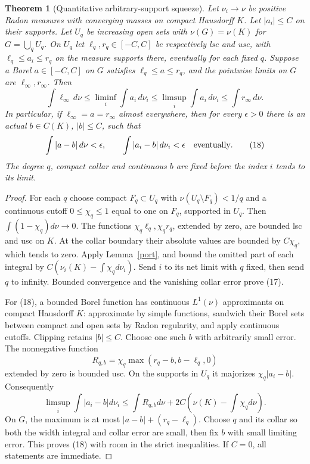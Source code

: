\documentclass[10pt]{article}
\newtheorem{theorem}{Theorem}[section]
\begin{document}
\begin{theorem}[Quantitative arbitrary-support squeeze]\label{squeeze}
Let $\nu_i\to\nu$ be positive Radon measures with converging masses on
compact Hausdorff $K$. Let $|a_i|\leq C$ on their supports. Let
$U_q$ be increasing open sets with $\nu(G)=\nu(K)$ for
$G=\bigcup_qU_q$. On $U_q$ let $\ell_q,r_q\in[-C,C]$ be respectively
lsc and usc, with $\ell_q\leq a_i\leq r_q$ on the measure supports
there, eventually for each fixed $q$.
Suppose a Borel $a\in[-C,C]$ on $G$ satisfies
$\ell_q\leq a\leq r_q$, and the pointwise limits on $G$ are
$\ell_\infty,r_\infty$. Then
\[
 \int\ell_\infty\,d\nu
 \leq\liminf_i\int a_i\,d\nu_i
 \leq\limsup_i\int a_i\,d\nu_i
 \leq\int r_\infty\,d\nu.                                \tag{17}
\]
In particular, if $\ell_\infty=a=r_\infty$ almost everywhere, then
for every $\epsilon>0$ there is an actual $b\in C(K)$, $|b|\leq C$,
such that
\[
 \int|a-b|\,d\nu<\epsilon,\qquad
 \int|a_i-b|\,d\nu_i<\epsilon\quad\hbox{eventually}.          \tag{18}
\]
The degree $q$, compact collar and continuous $b$ are fixed before
the index $i$ tends to its limit.
\end{theorem}
\begin{proof}
For each $q$ choose compact $F_q\subset U_q$ with
$\nu(U_q\setminus F_q)<1/q$ and a continuous cutoff $0\leq\chi_q\leq1$
equal to one on $F_q$, supported in $U_q$. Then
$\int(1-\chi_q)d\nu\to0$.
The functions $\chi_q\ell_q,\chi_qr_q$, extended by zero, are
bounded lsc and usc on $K$. At the collar boundary their absolute
values are bounded by $C\chi_q$, which tends to zero.
Apply Lemma~\ref{port}, and bound the omitted part of each integral
by $C(\nu_i(K)-\int\chi_qd\nu_i)$. Send $i$ to its net limit
with $q$ fixed, then send $q$ to infinity.
Bounded convergence and the vanishing collar error prove (17).

For (18), a bounded Borel function has continuous $L^1(\nu)$
approximants on compact Hausdorff $K$: approximate by simple functions,
sandwich their Borel sets between compact and open sets by Radon
regularity, and apply continuous cutoffs. Clipping retains $|b|\leq C$.
Choose one such $b$ with arbitrarily small error. The nonnegative
function
\[
 R_{q,b}=\chi_q\max(r_q-b,b-\ell_q,0)
\]
extended by zero is bounded usc. On the supports in $U_q$ it
majorizes $\chi_q|a_i-b|$. Consequently
\[
 \limsup_i\int|a_i-b|d\nu_i
 \leq\int R_{q,b}d\nu+
              2C\left(\nu(K)-\int\chi_qd\nu\right).
\]
On $G$, the maximum is at most $|a-b|+(r_q-\ell_q)$.
Choose $q$ and its collar so both the width integral and collar
error are small, then fix $b$ with small limiting error.
This proves (18) with room in the strict inequalities.
If $C=0$, all statements are immediate.
\end{proof}
\end{document}
